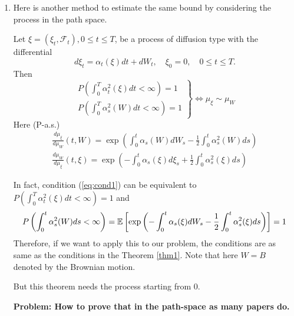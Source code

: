 \documentclass[a4paper,12pt]{article}
\begin{document}
\begin{enumerate}[label=(\arabic*)]
  \item Here is another method to estimate the same bound by considering the process in the path space. 
  \begin{thm}
    Let $\xi=\left(\xi_t, \mathcal{F}_t\right), 0 \leq t \leq T$, be a process of diffusion type with the differential
    $$
    d \xi_t=\alpha_t(\xi) d t+d W_t, \quad \xi_0=0, \quad 0 \leq t \leq T .
    $$
    Then
    \begin{equation}\label{eq:cond1}
      \left.\begin{array}{l}
      P\left(\int_0^T \alpha_t^2(\xi) d t<\infty\right)=1 \\
      P\left(\int_0^T \alpha_s^2(W) d t<\infty\right)=1
      \end{array}\right\} \Leftrightarrow \mu_{\xi} \sim \mu_W
    \end{equation}
    Here (P-a.s.)
    $$
    \begin{gathered}
    \frac{d \mu_{\xi}}{d \mu_W}(t, W)=\exp \left(\int_0^t \alpha_s(W) d W_s-\frac{1}{2} \int_0^t \alpha_s^2(W) d s\right) \\
    \frac{d \mu_W}{d \mu_{\xi}}(t, \xi)=\exp \left(-\int_0^t \alpha_s(\xi) d \xi_s+\frac{1}{2} \int_0^t \alpha_s^2(\xi) d s\right)
    \end{gathered}
    $$
  \end{thm}
  \begin{rmk}
    In fact, condition (\ref{eq:cond1}) can be equivalent to $P\left(\int_0^T \alpha_t^2(\xi) d t<\infty\right)=1$ and
    \begin{equation*}
      P\left(\int_0^t \alpha_s^2(W) d s<\infty\right)=\mathbb{E} \left[\exp \left(-\int_0^t \alpha_s(\xi) d W_s-\frac{1}{2} \int_0^t \alpha_s^2(\xi) d s\right)\right] = 1
    \end{equation*}
    Therefore, if we want to apply this to our problem, the conditions are as same as the conditions in the Theorem \ref{thm1}. Note that here $W =B$ denoted by the Brownian motion.
  \end{rmk}
  But this theorem needs the process starting from $0$.
  
  \noindent \textbf{Problem: How to prove that in the path-space as many papers do.}
\end{enumerate}
\end{document}
